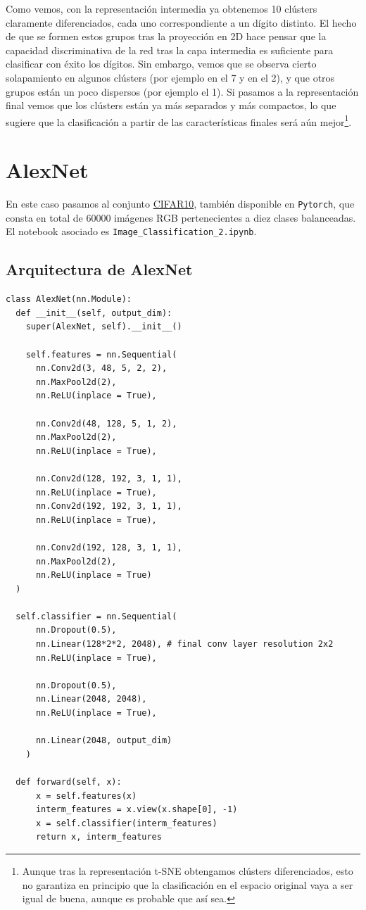 \documentclass[11pt]{article}
\begin{document}
Como vemos, con la representación intermedia ya obtenemos 10 clústers claramente diferenciados, cada uno correspondiente a un dígito distinto. El hecho de que se formen estos grupos tras la proyección en 2D hace pensar que la capacidad discriminativa de la red tras la capa intermedia es suficiente para clasificar con éxito los dígitos. Sin embargo, vemos que se observa cierto solapamiento en algunos clústers (por ejemplo en el 7 y en el 2), y que otros grupos están un poco dispersos (por ejemplo el 1). Si pasamos a la representación final vemos que los clústers están ya más separados y más compactos, lo que sugiere que la clasificación a partir de las características finales será aún mejor\footnote{Aunque tras la representación t-SNE obtengamos clústers diferenciados, esto no garantiza en principio que la clasificación en el espacio original vaya a ser igual de buena, aunque es probable que así sea.}.
\newpage

\section{AlexNet}

En este caso pasamos al conjunto \href{https://pytorch.org/vision/stable/datasets.html#cifar}{CIFAR10}, también disponible en \verb|Pytorch|, que consta en total de 60000 imágenes RGB pertenecientes a diez clases balanceadas. El notebook asociado es \verb|Image_Classification_2.ipynb|.

\subsection*{Arquitectura de AlexNet}

\begin{verbatim}
class AlexNet(nn.Module):
  def __init__(self, output_dim):
    super(AlexNet, self).__init__()

    self.features = nn.Sequential(
      nn.Conv2d(3, 48, 5, 2, 2),
      nn.MaxPool2d(2),
      nn.ReLU(inplace = True),

      nn.Conv2d(48, 128, 5, 1, 2),
      nn.MaxPool2d(2),
      nn.ReLU(inplace = True),

      nn.Conv2d(128, 192, 3, 1, 1),
      nn.ReLU(inplace = True),
      nn.Conv2d(192, 192, 3, 1, 1),
      nn.ReLU(inplace = True),

      nn.Conv2d(192, 128, 3, 1, 1),
      nn.MaxPool2d(2),
      nn.ReLU(inplace = True)
  )

  self.classifier = nn.Sequential(
      nn.Dropout(0.5),
      nn.Linear(128*2*2, 2048), # final conv layer resolution 2x2
      nn.ReLU(inplace = True),

      nn.Dropout(0.5),
      nn.Linear(2048, 2048),
      nn.ReLU(inplace = True),

      nn.Linear(2048, output_dim)
    )

  def forward(self, x):
      x = self.features(x)
      interm_features = x.view(x.shape[0], -1)
      x = self.classifier(interm_features)
      return x, interm_features
\end{verbatim}
\end{document}
